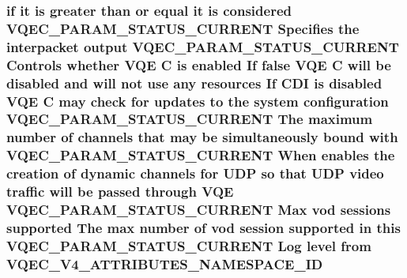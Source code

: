 \subsubsection{\setlength{\rightskip}{0pt plus 5cm}if it is greater than or equal it is considered VQEC\_\-PARAM\_\-STATUS\_\-CURRENT Specifies the interpacket output VQEC\_\-PARAM\_\-STATUS\_\-CURRENT Controls whether VQE \bf{C} is enabled If false VQE \bf{C} will be disabled and will not use any resources If CDI is disabled VQE \bf{C} may check for updates \bf{to} the system configuration VQEC\_\-PARAM\_\-STATUS\_\-CURRENT The maximum number of \bf{channels} that may be simultaneously bound with VQEC\_\-PARAM\_\-STATUS\_\-CURRENT When enables the creation of dynamic \bf{channels} for UDP so that UDP video traffic will be passed through VQE VQEC\_\-PARAM\_\-STATUS\_\-CURRENT Max vod sessions supported The max number of vod session supported in \bf{this} VQEC\_\-PARAM\_\-STATUS\_\-CURRENT Log level from \bf{VQEC\_\-V4\_\-ATTRIBUTES\_\-NAMESPACE\_\-ID}}\label{vqec__cfg__settings_8h_80e8911220ecdf5ea2656a14a20b7126}


